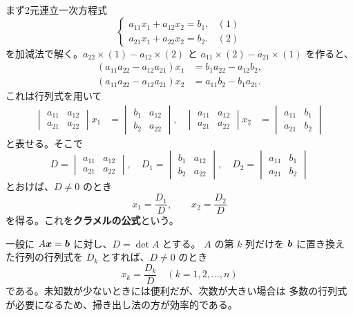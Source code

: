 まず2元連立一次方程式
\begin{equation}
 \begin{cases}
  a_{11}x_1+a_{12}x_2=b_1, &(1)\\
  a_{21}x_1+a_{22}x_2=b_2. &(2)
 \end{cases}
\end{equation}
を加減法で解く。$a_{22}\times(1)-a_{12}\times(2)$ と
$a_{11}\times(2)-a_{21}\times(1)$ を作ると、
\begin{align}
 (a_{11}a_{22}-a_{12}a_{21})x_1&=b_1a_{22}-a_{12}b_2,\label{eq:cramer-x1}\\
 (a_{11}a_{22}-a_{12}a_{21})x_2&=a_{11}b_2-b_1a_{21}.\label{eq:cramer-x2}
\end{align}
これは行列式を用いて
\begin{align}
 \begin{vmatrix}a_{11}&a_{12}\\a_{21}&a_{22}\end{vmatrix}x_1
 &=\begin{vmatrix}b_1&a_{12}\\b_2&a_{22}\end{vmatrix},&
 \begin{vmatrix}a_{11}&a_{12}\\a_{21}&a_{22}\end{vmatrix}x_2
 &=\begin{vmatrix}a_{11}&b_1\\a_{21}&b_2\end{vmatrix}
\end{align}
と表せる。そこで
\[
 D=\begin{vmatrix}a_{11}&a_{12}\\a_{21}&a_{22}\end{vmatrix},\quad
 D_1=\begin{vmatrix}b_1&a_{12}\\b_2&a_{22}\end{vmatrix},\quad
 D_2=\begin{vmatrix}a_{11}&b_1\\a_{21}&b_2\end{vmatrix}
\]
とおけば、$D\ne0$ のとき
\begin{equation}
 \boxed{x_1=\frac{D_1}{D},\qquad x_2=\frac{D_2}{D}}
\end{equation}
を得る。これを\textbf{クラメルの公式}という。

一般に $A\bm{x}=\bm{b}$ に対し、$D=\det A$ とする。
$A$ の第 $k$ 列だけを $\bm{b}$ に置き換えた行列の行列式を
$D_k$ とすれば、$D\ne0$ のとき
\begin{equation}
 \boxed{x_k=\frac{D_k}{D}\quad(k=1,2,\ldots,n)}
\end{equation}
である。未知数が少ないときには便利だが、次数が大きい場合は
多数の行列式が必要になるため、掃き出し法の方が効率的である。

